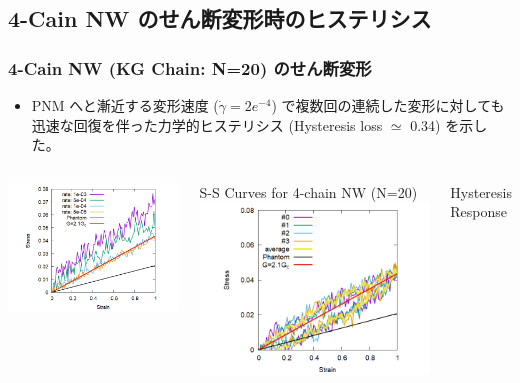 \documentclass[aspectratio=169,11pt, dvipdfmx]{beamer}
\begin{document}
\subsection{4-Cain NW のせん断変形時のヒステリシス}
\begin{frame}
	\frametitle{4-Cain NW (KG Chain: N=20) のせん断変形}
	\begin{itemize}
		\item PNM へと漸近する変形速度 ($\dot{\gamma} = 2e^{-4}$) で複数回の連続した変形に対しても迅速な回復を伴った力学的ヒステリシス (Hysteresis loss $\simeq$ 0.34) を示した。
	\end{itemize}

	\begin{columns}[totalwidth=\linewidth]
			\centering
				\includegraphics[width=\textwidth]{Shear_Random_4chain_N20.png}

				S-S Curves for 4-chain NW (N=20)
			\centering
				\includegraphics[width=\textwidth]{CyclicDeform_4chain_rate_2e-4.png}

				Hysteresis Response 
		\end{columns}
\end{frame}
\end{document}
